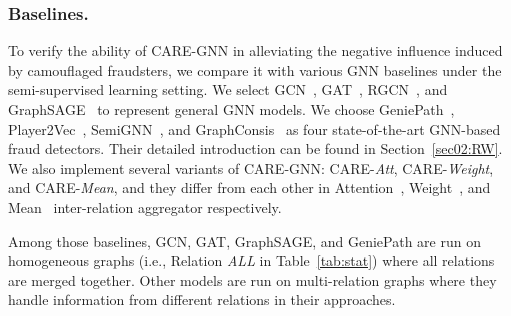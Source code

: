 \subsubsection{Baselines.}
To verify the ability of CARE-GNN in alleviating the negative influence induced by camouflaged fraudsters, we compare it with various GNN baselines under the semi-supervised learning setting. We select GCN~\cite{kipf2016semi}, GAT~\cite{velivckovic2017graph}, RGCN~\cite{schlichtkrull2018modeling}, and GraphSAGE~\cite{hamilton2017inductive} to represent general GNN models. We choose GeniePath~\cite{liu2019geniepath}, Player2Vec~\cite{zhang2019key}, SemiGNN~\cite{wang2019semi}, and GraphConsis~\cite{liu2020alleviating} as four state-of-the-art GNN-based fraud detectors. Their detailed introduction can be found in Section~\ref{sec02:RW}. We also implement several variants of CARE-GNN: CARE-\textit{Att}, CARE-\textit{Weight}, and CARE-\textit{Mean}, and they differ from each other in Attention~\cite{velivckovic2017graph}, Weight~\cite{liu2018heterogeneous}, and Mean~\cite{hamilton2017inductive} inter-relation aggregator respectively.

Among those baselines, GCN, GAT, GraphSAGE, and GeniePath are run on homogeneous graphs (i.e., Relation \textit{ALL} in Table~\ref{tab:stat}) where all relations are merged together. Other models are run on multi-relation graphs where they handle information from different relations in their approaches.


